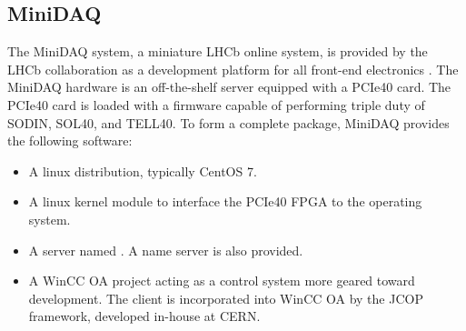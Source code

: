
%
%


\subsection{MiniDAQ}
\label{online-minidaq}

The MiniDAQ system,
a miniature LHCb online system,
is provided by the LHCb collaboration as a development
platform for all front-end electronics \cite{GranadoCardoso:2702137}.
The MiniDAQ hardware is an off-the-shelf server equipped with a PCIe40 card.
The PCIe40 card is loaded with a firmware capable
of performing triple duty of SODIN, SOL40, and TELL40.
To form a complete package, MiniDAQ provides the following software:

\begin{itemize}
    \item A linux distribution, typically CentOS 7.
    \item A linux kernel module to interface the PCIe40 FPGA to the operating
        system.
    \item A \dim server named . A \dim name server is also
        provided.
    \item A WinCC OA project acting as a control system more geared toward
        development.
        The \dim client is incorporated into WinCC OA by the JCOP framework,
        developed in-house at CERN.
\end{itemize}

